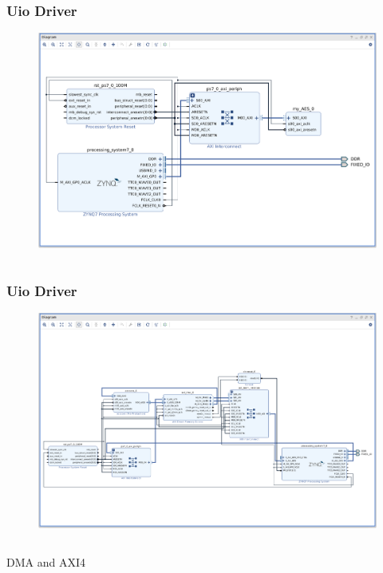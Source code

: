 \documentclass{beamer}
\begin{document}
\begin{frame}[fragile]
\frametitle{Uio Driver}
\begin{figure}
\centering\includegraphics[scale=0.2]{vivado-tinyaes.png}
\end{figure}
\begin{verbatim}
\end{verbatim}
\end{frame}

\begin{frame}[fragile]
\frametitle{Uio Driver}
\begin{figure}
\centering\includegraphics[scale=0.25]{vivado-ecc.png}
\end{figure}
\begin{verbatim}
\end{verbatim}
\end{frame}

\begin{frame}
\centering DMA and AXI4
\end{frame}
\end{document}
